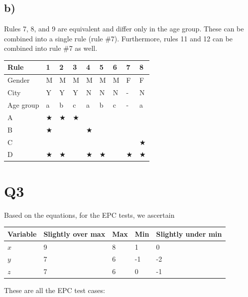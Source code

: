 \documentclass[12pt, letterpaper, titlepage]{article}
\begin{document}
\subsection*{b)}
Rules 7, 8, and 9 are equivalent and differ only in the age group. These can be combined into a single rule (rule \#7). Furthermore, rules 11 and 12 can be combined into rule \#7 as well.

\begin{centering}
\begin{tabularx}{\textwidth}{|X|s|s|s|s|s|s|s|s|}
    \hline
    \textbf{Rule} & \textbf{1} & \textbf{2} & \textbf{3} & \textbf{4} & \textbf{5} & \textbf{6} & \textbf{7} & \textbf{8} \\
    \hline
    Gender & M & M & M & M & M & M & F & F \\
    \hline
    City & Y & Y & Y & N & N & N & - & N \\
    \hline
    Age group & a&b&c&a&b&c&-&a \\
    \hline
    A &$\bigstar$&$\bigstar$&$\bigstar$ &&& & & \\
    \hline
    B &$\bigstar$&& &$\bigstar$&& & & \\
    \hline
    C &&& &&& & &$\bigstar$ \\
    \hline
    D &$\bigstar$&$\bigstar$& &$\bigstar$&$\bigstar$& &$\bigstar$ &$\bigstar$ \\
    \hline
\end{tabularx}
\end{centering}

\section*{Q3}
Based on the equations, for the EPC tests, we ascertain

\noindent
\begin{tabularx}{\textwidth}{|X|X|a|a|X|}
    \hline
    \textbf{Variable} & Slightly over max & Max & Min & Slightly under min \\
    \hline
    $x$ & 9 & 8 & 1 & 0 \\
    \hline
    $y$ & 7 & 6 & -1 & -2 \\
    \hline
    $z$ & 7 & 6 & 0 & -1 \\
    \hline
\end{tabularx}

These are all the EPC test cases:
\end{document}
